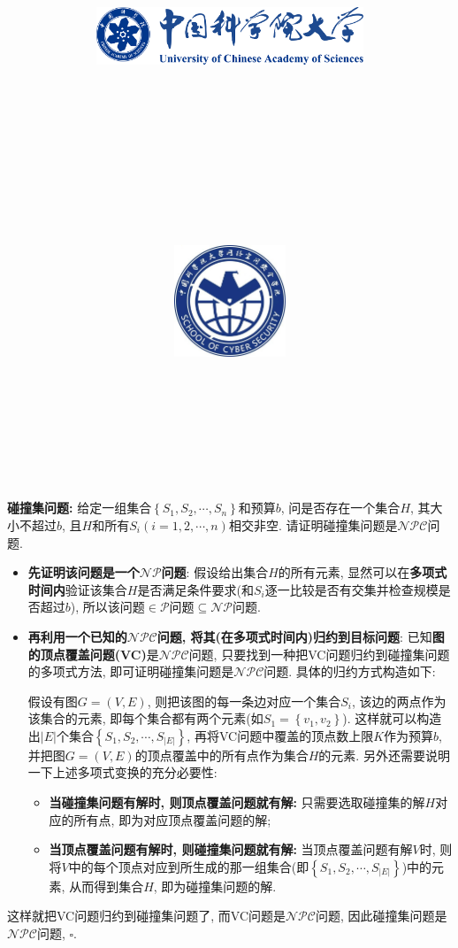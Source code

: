 \documentclass{article}
\title{
	\includegraphics[width=0.6\textwidth]{images/title/ucas_logo 1.pdf}\\
    \vspace{1in}
    \textmd{\textbf{\hmwkClass}}\\
	\textmd{\Large{\textbf{\hmwkClassID}}}\\
    \textmd{\textbf{\hmwkTitle}}\\
    \normalsize\vspace{0.1in}\large{\hmwkCompleteTime }\\
    \vspace{0.1in}\large{\textit{\hmwkClassInstructor\ }}\\
    \vspace{1in}
	\includegraphics[width=0.25\textwidth]{images/title/Cyber.jpg}\\
	\vspace{1in}
}
\author{
	\hmwkAuthorName \\ 
	\hmwkAuthorStuID \\
	\hmwkAuthorInst \\
	\hmwkAuthorzhuanye \\
	\hmwkAuthorfangxiang
	}
\date{}
\begin{document}
\maketitle


%
%
%
%
%


\pagebreak



\begin{homeworkProblem}
	\textbf{碰撞集问题:} 给定一组集合$\left\{ S_1,S_2,\cdots ,S_n \right\}$和预算$b$, 问是否存在一个集合$H$, 其大小不超过$b$, 且$H$和所有$S_i(i=1,2,\cdots,n)$相交非空. 请证明碰撞集问题是$\mathcal{NPC}$问题.

	\solution
	\begin{itemize}
		\item \textbf{先证明该问题是一个$\mathcal{NP}$问题}: 假设给出集合$H$的所有元素, 显然可以在\textbf{多项式时间内}验证该集合$H$是否满足条件要求(和$S_i$逐一比较是否有交集并检查规模是否超过$b$), 所以该问题$\in \mathcal{P}$问题$\subseteq \mathcal{NP}$问题.
		\item \textbf{再利用一个已知的$\mathcal{NPC}$问题, 将其(在多项式时间内)归约到目标问题}: 已知\textbf{图的顶点覆盖问题(VC)}是$\mathcal{NPC}$问题, 只要找到一种把VC问题归约到碰撞集问题的多项式方法, 即可证明碰撞集问题是$\mathcal{NPC}$问题. 具体的归约方式构造如下:
		
		假设有图$G=(V,E)$, 则把该图的每一条边对应一个集合$S_i$, 该边的两点作为该集合的元素, 即每个集合都有两个元素(如$S_1=\left\{ v_1,v_2 \right\}$). 这样就可以构造出$|E|$个集合$\left\{ S_1,S_2,\cdots ,S_{\left| E \right|} \right\}$, 再将VC问题中覆盖的顶点数上限$K$作为预算$b$, 并把图$G=(V,E)$的顶点覆盖中的所有点作为集合$H$的元素. 另外还需要说明一下上述多项式变换的充分必要性:
		\begin{itemize}
			\item \textbf{当碰撞集问题有解时, 则顶点覆盖问题就有解:} 只需要选取碰撞集的解$H$对应的所有点, 即为对应顶点覆盖问题的解;
			\item \textbf{当顶点覆盖问题有解时, 则碰撞集问题就有解:} 当顶点覆盖问题有解$V$时, 则将$V$中的每个顶点对应到所生成的那一组集合(即$\left\{ S_1,S_2,\cdots ,S_{\left| E \right|} \right\}$)中的元素, 从而得到集合$H$, 即为碰撞集问题的解.
		\end{itemize}
	\end{itemize}
	这样就把VC问题归约到碰撞集问题了, 而VC问题是$\mathcal{NPC}$问题, 因此碰撞集问题是$\mathcal{NPC}$问题, $\square$.
\end{homeworkProblem}
\end{document}
